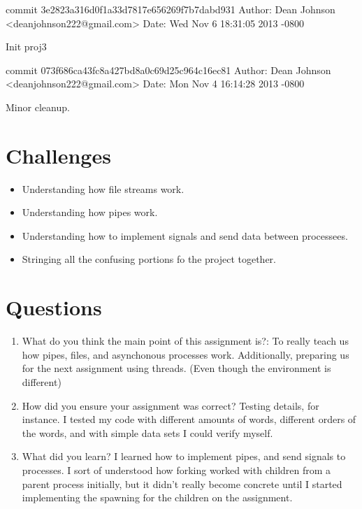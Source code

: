 \documentclass[fleqn,10pt,titlepage]{article}
\begin{document}
commit 3e2823a316d0f1a33d7817e656269f7b7dabd931
Author: Dean Johnson <deanjohnson222@gmail.com>
Date:   Wed Nov 6 18:31:05 2013 -0800

    Init proj3

commit 073f686ca43fc8a427bd8a0c69d25c964c16ec81
Author: Dean Johnson <deanjohnson222@gmail.com>
Date:   Mon Nov 4 16:14:28 2013 -0800

    Minor cleanup.
\clearpage

\section{Challenges}
\begin{itemize}
\item Understanding how file streams work.
\item Understanding how pipes work.
\item Understanding how to implement signals and send data between processees.
\item Stringing all the confusing portions fo the project together.
\end{itemize}
\clearpage

\section{Questions}
\begin{enumerate}
\item What do you think the main point of this assignment is?:  To really teach us how pipes, files, and 
asynchonous processes work. Additionally, preparing us for the next assignment using threads. (Even though
the environment is different)\\ 
\item How did you ensure your assignment was correct? Testing details, for instance. I tested my code with
different amounts of words, different orders of the words, and with simple data sets I could verify myself.\\ 
\item What did you learn? I learned how to implement pipes, and send signals to processes. I sort of understood
how forking worked with children from a parent process initially, but it didn't really become concrete until I
started implementing the spawning for the children on the assignment.\\ 
\end{enumerate}
\end{document}
